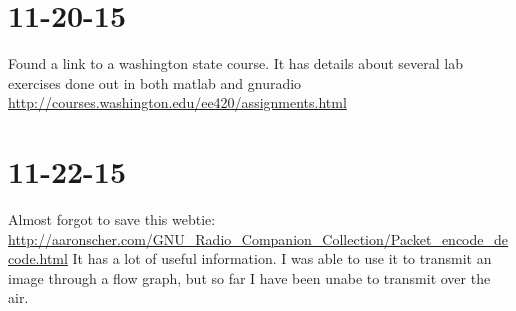 \documentclass{article}
\begin{document}
	\section{11-20-15}
	Found a link to a washington state course. It has details about several lab exercises done out in both
	matlab and gnuradio \href{http://courses.washington.edu/ee420/assignments.html}{http://courses.washington.edu/ee420/assignments.html}

	\section{11-22-15}
	Almost forgot to save this webtie:
	\href{http://aaronscher.com/GNU_Radio_Companion_Collection/Packet_encode_decode.html}{http://aaronscher.com/GNU_Radio_Companion_Collection/Packet_encode_decode.html}
	It has a lot of useful information. I was able to use it to transmit an image through a flow graph, but so far I have been unabe
	to transmit over the air. 
\end{document}
